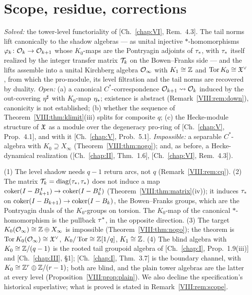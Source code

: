 \section{Scope, residue, corrections}\label{VIII:sec:scope}

\begin{remark}\label{VIII:rem:scope}
\emph{Solved:} the tower-level functoriality of [Ch.~\ref{chap:VI}, Rem.~4.3]. The tail norms lift
canonically to the shadow algebras --- as unital injective $*$-homomorphisms
$\varphi_k\colon\mathcal{O}_k\to\mathcal{O}_{k+1}$ whose $K_0$-maps are the Pontryagin adjoints of $\tau_*$,
with $\tau_*$ itself realized by the integer transfer matrix $\mathcal{T}_{k}$ on the Bowen--Franks
side --- and the lifts assemble into a unital Kirchberg algebra $\mathcal{O}_\infty$ with
$K_1\cong\mathbb{Z}$ and $\operatorname{Tor} K_0\cong\mathfrak{X}^{\vee}$, from which the pro-module, its level
filtration and the tail norms are recovered by duality. \emph{Open:} (a) a canonical
$C^*$-correspondence $\mathcal{O}_{k+1}\rightsquigarrow\mathcal{O}_k$ induced by the out-covering
${\eta}^{\sharp}$ with $K_0$-map $\eta_*$; existence is abstract (Remark~\ref{VIII:rem:down}),
canonicity is not established; (b) whether the sequence of
Theorem~\ref{VIII:thm:klimit}(iii) splits for composite $q$; (c) the Hecke-module structure of
$\mathfrak{X}$ as a module over the degeneracy pro-ring of [Ch.~\ref{chap:V}, Prop.~4.1], and with it
[Ch.~\ref{chap:V}, Prob.~5.1]. \emph{Impossible:} a separable $C^*$-algebra with $K_0\supseteq X_\infty$
(Theorem~\ref{VIII:thm:nogo}); and, as before, a Hecke-dynamical realization
([Ch.~\ref{chap:II}, Thm.~1.6], [Ch.~\ref{chap:VI}, Rem.~4.3]).
\end{remark}

\begin{remark}\label{VIII:rem:corrections}
(1) The level shadow needs $q-1$ return arcs, not $q$ (Remark~\ref{VIII:rem:cq}). (2) The
matrix $\mathcal{T}_{k}=\operatorname{diag}(\tau_*,\tau_*)$ does not induce a map
$\operatorname{coker}(I-B_{k+1}^{\,t})\to\operatorname{coker}(I-B_k^{\,t})$ (Theorem~\ref{VIII:thm:matrix}(iv)); it induces
$\tau_*$ on $\operatorname{coker}(I-B_{k+1})\to\operatorname{coker}(I-B_k)$, the Bowen--Franks groups, which are the
Pontryagin duals of the $K_0$-groups on torsion. The $K_0$-map of the canonical
$*$-homomorphism is the pullback $\tau^*$, in the opposite direction. (3) The target
$K_0(\mathcal{O}_\infty)\cong\mathbb{Z}\oplus X_\infty$ is impossible (Theorem~\ref{VIII:thm:nogo}); the
theorem is $\operatorname{Tor} K_0(\mathcal{O}_\infty)\cong\mathfrak{X}^{\vee}$, $K_0/\operatorname{Tor}\cong\mathbb{Z}[1/q]$, $K_1\cong\mathbb{Z}$. (4)
The blind algebra with $K_0\cong\mathbb{Z}/(q-1)$ is the rooted tail groupoid algebra of
[Ch.~\ref{chap:I}, Prop.~1.9(iii)] and [Ch.~\ref{chap:III}, \S1]; [Ch.~\ref{chap:I}, Thm.~3.7] is the boundary channel, with
$K_0\cong\mathbb{Z}^r\oplus\mathbb{Z}/(r-1)$; both are blind, and the plain tower algebras are the latter
at every level (Proposition~\ref{VIII:prop:plain}). We also decline the specification's
historical superlative; what is proved is stated in Remark~\ref{VIII:rem:scope}.
\end{remark}

